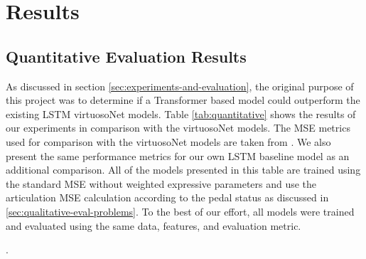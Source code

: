 \chapter{Results} \label{ch:ch5}

\section{Quantitative Evaluation Results}
As discussed in section \ref{sec:experiments-and-evaluation}, the original purpose of this project was to determine if a Transformer based model could outperform the existing LSTM virtuosoNet models. Table \ref{tab:quantitative} shows the results of our experiments in comparison with the virtuosoNet models. The MSE metrics used for comparison with the virtuosoNet models are taken from \cite{jeong2019virtuosonet}. We also present the same performance metrics for our own LSTM baseline model as an additional comparison. All of the models presented in this table are trained using the standard MSE without weighted expressive parameters and use the articulation MSE calculation according to the pedal status as discussed in \ref{sec:qualitative-eval-problems}. To the best of our effort, all models were trained and evaluated using the same data, features, and evaluation metric. 

. 


\newcommand{\nep}{$N_{id}$}
\newcommand{\mn}{$M$} %
\newcommand{\nl}{$L$} %
\newcommand{\dhid}{$d_{hid}$} %
\newcommand{\drop}{$D$} %
\newcommand{\lr}{$LR$} %
\newcommand{\clip}{$C$} %
\newcommand{\nh}{$H$} %

\newcommand{\temp}{$t$}
\newcommand{\vel}{$v$}
\newcommand{\dev}{$d$}
\newcommand{\art}{$a$}
\newcommand{\ped}{$p$}


